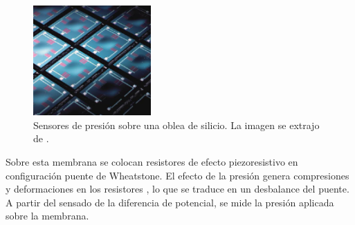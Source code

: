 \begin{figure}[htb]
    \centering
    \includegraphics[width=0.4\textwidth]{img/MEMS_barometro.png}
    \caption{Sensores de presión sobre una oblea de silicio. La imagen se extrajo de \cite{baro_1}.}
    \label{fig:MEMS_barometro}
\end{figure}

Sobre esta membrana se colocan resistores de efecto piezoresistivo en configuración puente de Wheatstone. El efecto de la presión genera compresiones y deformaciones en los resistores \cite{baro_3}, lo que se traduce en un desbalance del puente. A partir del sensado de la diferencia de potencial, se mide la presión aplicada sobre la membrana.








